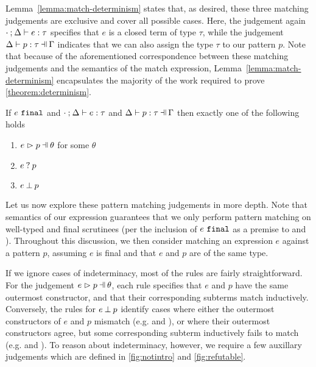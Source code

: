 \pagebreak



Lemma~\ref{lemma:match-determinism} states that, as desired, these three matching judgements are exclusive and cover all possible cases. Here, the judgement again $\cdot \mathbin{;} \Delta \vdash e : \tau$ specifies that $e$ is a closed term of type $\tau$, while the judgement $\hpattyp{p}{\tau}{\Gamma}{\Delta}$ indicates that we can also assign the type $\tau$ to our pattern $p$. Note that because of the aforementioned correspondence between these matching judgements and the semantics of the match expression, Lemma~\ref{lemma:match-determinism} encapsulates the majority of the work required to prove \autoref{theorem:determinism}.

\begin{lemma}
	\label{lemma:match-determinism}
	If $e ~\mathtt{final}$ and $\cdot \mathbin{;} \Delta \vdash e : \tau$ and $\hpattyp{p}{\tau}{\Gamma}{\Delta}$ then exactly one of the following holds
	\begin{enumerate}
		\item $\hpatmatch{e}{p}{\theta}$ for some $\theta$
		\item $e \mathbin{?} p$
		\item $e \mathbin{\bot} p$
	\end{enumerate}
\end{lemma}

Let us now explore these pattern matching judgements in more depth. Note that semantics of our expression guarantees that we only perform pattern matching on well-typed and final scrutinees (per the inclusion of $e ~\mathtt{final}$ as a premise to \ITSuccMatch and \ITFailMatch). Throughout this discussion, we then consider matching an expression $e$ against a pattern $p$, assuming $e$ is final and that $e$ and $p$ are of the same type.

If we ignore cases of indeterminacy, most of the rules are fairly straightforward. For the judgement $\hpatmatch{e}{p}{\theta}$, each rule specifies that $e$ and $p$ have the same outermost constructor, and that their corresponding subterms match inductively. Conversely, the rules for $e \mathbin{\bot} p$ identify cases where either the outermost constructors of $e$ and $p$ mismatch (e.g. \NMConfL and \NMConfR), or where their outermost constructors agree, but some corresponding subterm inductively fails to match (e.g. \NMPairL and \NMPairR). To reason about indeterminacy, however, we require a few auxillary judgements which are defined in \autoref{fig:notintro} and \autoref{fig:refutable}.\\


